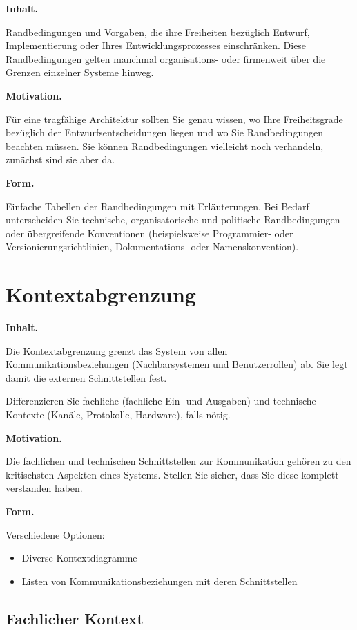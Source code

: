 \documentclass[]{article}
\begin{document}
\textbf{Inhalt.}

Randbedingungen und Vorgaben, die ihre Freiheiten bezüglich Entwurf,
Implementierung oder Ihres Entwicklungsprozesses einschränken. Diese
Randbedingungen gelten manchmal organisations- oder firmenweit über die
Grenzen einzelner Systeme hinweg.

\textbf{Motivation.}

Für eine tragfähige Architektur sollten Sie genau wissen, wo Ihre
Freiheitsgrade bezüglich der Entwurfsentscheidungen liegen und wo Sie
Randbedingungen beachten müssen. Sie können Randbedingungen vielleicht
noch verhandeln, zunächst sind sie aber da.

\textbf{Form.}

Einfache Tabellen der Randbedingungen mit Erläuterungen. Bei Bedarf
unterscheiden Sie technische, organisatorische und politische
Randbedingungen oder übergreifende Konventionen (beispielsweise
Programmier- oder Versionierungsrichtlinien, Dokumentations- oder
Namenskonvention).

\hypertarget{section-system-scope-and-context}{%
\section{Kontextabgrenzung}\label{section-system-scope-and-context}}

\textbf{Inhalt.}

Die Kontextabgrenzung grenzt das System von allen
Kommunikationsbeziehungen (Nachbarsystemen und Benutzerrollen) ab. Sie
legt damit die externen Schnittstellen fest.

Differenzieren Sie fachliche (fachliche Ein- und Ausgaben) und
technische Kontexte (Kanäle, Protokolle, Hardware), falls nötig.

\textbf{Motivation.}

Die fachlichen und technischen Schnittstellen zur Kommunikation gehören
zu den kritischsten Aspekten eines Systems. Stellen Sie sicher, dass Sie
diese komplett verstanden haben.

\textbf{Form.}

Verschiedene Optionen:

\begin{itemize}
\item
  Diverse Kontextdiagramme
\item
  Listen von Kommunikationsbeziehungen mit deren Schnittstellen
\end{itemize}

\hypertarget{_fachlicher_kontext}{%
\subsection{Fachlicher Kontext}\label{_fachlicher_kontext}}
\end{document}
